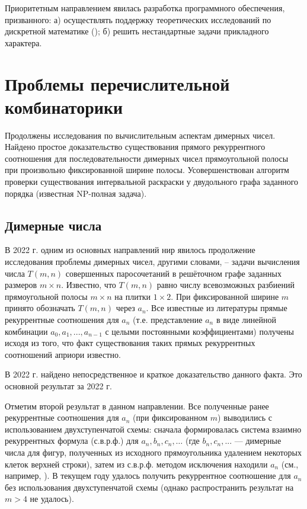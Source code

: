 Приоритетным направлением явилась разработка программного обеспечения, призванного: а) осуществлять поддержку теоретических исследований по дискретной математике (\cite{akm-bib-m9, akm-bib-m10, akm-bib-m14, akm-bib-m15}); б) решить нестандартные задачи прикладного характера.


\section{Проблемы перечислительной комбинаторики}

Продолжены исследования по вычислительным аспектам димерных чисел. Найдено простое доказательство существования прямого рекуррентного соотношения для последовательности димерных чисел прямоугольной полосы при произвольно фиксированной ширине полосы. Усовершенствован алгоритм проверки существования интервальной раскраски у двудольного графа заданного порядка (известная NP-полная задача).


\subsection{Димерные числа}

В 2022 г. одним из основных направлений нир явилось продолжение исследования проблемы димерных чисел, другими словами, -- задачи вычисления числа $T(m,n)$ совершенных паросочетаний в решёточном графе заданных размеров $m\times n$. Известно, что $T(m,n)$ равно числу всевозможных разбиений прямоугольной полосы $m\times n$ на плитки $1\times 2$. При фиксированной ширине $m$ принято обозначать $T(m,n)$ через $a_n$. Все известные из литературы прямые рекуррентные соотношения для $a_n$ (т.е. представление $a_n$ в виде линейной комбинации $a_0, a_1,..., a_{n-1}$ с целыми постоянными коэффициентами) получены исходя из того, что факт существования таких прямых рекуррентных соотношений априори известно.

В 2022 г. найдено непосредственное и краткое доказательство данного факта. Это основной результат за 2022 г.

Отметим второй результат в данном направлении. Все полученные ранее рекуррентные соотношения для
$a_n$ (при фиксированном $m$) выводились с использованием двухступенчатой схемы: сначала формировалась система взаимно рекуррентных формула (с.в.р.ф.) для $a_n, b_n, c_n, \dots$ (где $b_n, c_n, ...$  --- димерные числа для фигур, полученных из исходного прямоугольника удалением некоторых клеток верхней строки), затем из с.в.р.ф. методом исключения находили $a_n$ (см., например, \cite{akm-bib-m3}). В текущем году удалось получить рекуррентное соотношение для $a_n$ без использования двухступенчатой схемы (однако распространить результат на $m>4$ не удалось).

